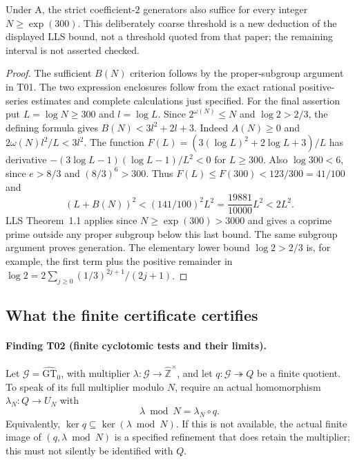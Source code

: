 \documentclass[11pt,a4paper]{article}
\begin{document}
Under A, the strict coefficient-$2$ generators also suffice for every
integer $N\ge\exp(300)$. This deliberately coarse threshold is a new
deduction of the displayed LLS bound, not a threshold quoted from that
paper; the remaining interval is not asserted checked.

\begin{proof}
The sufficient $B(N)$ criterion follows by the proper-subgroup argument
in T01. The two expression enclosures follow from the exact rational
positive-series estimates and complete calculations just specified.
For the final assertion put $L=\log N\ge300$ and $l=\log L$.
Since $2^{\omega(N)}\le N$ and $\log2>2/3$, the defining formula gives
$B(N)<3l^2+2l+3$. Indeed $A(N)\ge0$ and
$2\omega(N)l^2/L<3l^2$. The function
$F(L)=(3(\log L)^2+2\log L+3)/L$ has derivative
$-(3\log L-1)(\log L-1)/L^2<0$ for $L\ge300$.
Also $\log300<6$, since $e>8/3$ and $(8/3)^6>300$.
Thus $F(L)\le F(300)<123/300=41/100$ and
\[
 (L+B(N))^2<(141/100)^2L^2
             =\frac{19881}{10000}L^2<2L^2.
\]
LLS Theorem~1.1 applies since $N\ge\exp(300)>3000$ and gives a
coprime prime outside any proper subgroup below this last bound.
The same subgroup argument proves generation. The elementary lower
bound $\log2>2/3$ is, for example, the first term plus the positive
remainder in $\log2=2\sum_{j\ge0}(1/3)^{2j+1}/(2j+1)$.
\end{proof}

\subsection{What the finite certificate certifies}

\paragraph{Finding T02 (finite cyclotomic tests and their limits).}
Let $\mathcal G=\widehat{\mathrm{GT}}_0$, with multiplier
$\lambda:\mathcal G\to\widehat{\mathbb Z}^{\times}$, and let
$q:\mathcal G\twoheadrightarrow Q$ be a finite quotient. To speak of
its full multiplier modulo $N$, require an actual homomorphism
$\lambda_N:Q\to U_N$ with
\[
                    \lambda\bmod N=\lambda_N\circ q.
 \tag{T02.1}
\]
Equivalently, $\ker q\subseteq\ker(\lambda\bmod N)$. If this is not
available, the actual finite image of $(q,\lambda\bmod N)$ is a
specified refinement that does retain the multiplier; this must not
silently be identified with $Q$.
\end{document}
